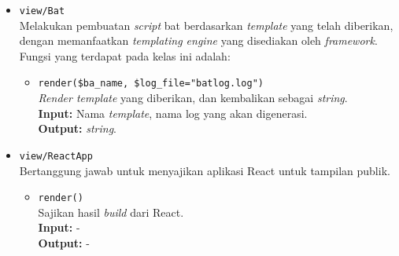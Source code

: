 \begin{itemize}
        \item \texttt{view/Bat} \\
            Melakukan pembuatan \textit{script} bat berdasarkan \textit{template} yang telah diberikan,
            dengan memanfaatkan \textit{templating engine} yang disediakan oleh \textit{framework}.
            Fungsi yang terdapat pada kelas ini adalah:
            \begin{itemize}
                \item \texttt{render(\$ba\_name, \$log\_file="batlog.log")} \\
                    \textit{Render template} yang diberikan, dan kembalikan sebagai \textit{string}. \\
                    \textbf{Input:} Nama \textit{template}, nama log yang akan digenerasi.\\
                    \textbf{Output:} \textit{string}.
            \end{itemize}
        
        \item \texttt{view/ReactApp} \\
            Bertanggung jawab untuk menyajikan aplikasi React untuk tampilan publik.
            \begin{itemize}
                \item \texttt{render()} \\
                    Sajikan hasil \textit{build} dari React. \\
                    \textbf{Input:} -\\
                    \textbf{Output:} -
            \end{itemize}
    \end{itemize}
    
